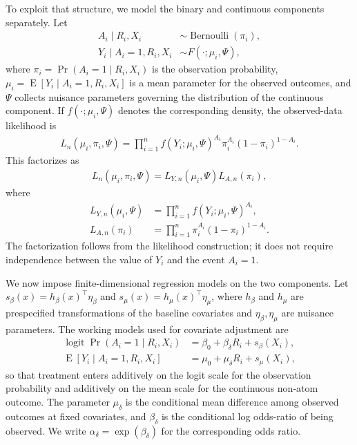 \documentclass[11pt]{article}
\DeclareMathOperator*{\E}{E}
\DeclareMathOperator*{\logit}{logit}
\DeclareMathOperator*{\Bernoulli}{Bernoulli}
\begin{document}
To exploit that structure, we model the binary and continuous components separately. Let
\begin{align*}
  A_i \mid R_i, X_i &\sim \Bernoulli\left(\pi_i\right),\\
  Y_i \mid A_i = 1, R_i, X_i &\sim F\left(\cdot; \mu_i, \Psi\right),
\end{align*}
where $\pi_i = \Pr(A_i = 1 \mid R_i, X_i)$ is the observation probability, $\mu_i = \E[Y_i \mid A_i = 1, R_i, X_i]$ is a mean parameter for the observed outcomes, and $\Psi$ collects nuisance parameters governing the distribution of the continuous component. If $f(\cdot; \mu_i, \Psi)$ denotes the corresponding density, the observed-data likelihood is
\begin{align*}
  L_n(\mu_i, \pi_i, \Psi)
  = \prod_{i = 1}^n
    f\left(Y_i; \mu_i, \Psi\right)^{A_i}
    \pi_i^{A_i}
    \left(1 - \pi_i\right)^{1 - A_i}.
\end{align*}
This factorizes as
\begin{align*}
  L_n(\mu_i, \pi_i, \Psi)
  = L_{Y,n}(\mu_i, \Psi)L_{A,n}(\pi_i),
\end{align*}
where
\begin{align*}
  L_{Y,n}(\mu_i, \Psi)
  &= \prod_{i = 1}^n f\left(Y_i; \mu_i, \Psi\right)^{A_i},\\
  L_{A,n}(\pi_i)
  &= \prod_{i = 1}^n \pi_i^{A_i}\left(1 - \pi_i\right)^{1 - A_i}.
\end{align*}
The factorization follows from the likelihood construction; it does not require independence between the value of $Y_i$ and the event $A_i = 1$.

We now impose finite-dimensional regression models on the two components. Let $s_\beta(x) = h_\beta(x)^\top\eta_\beta$ and $s_\mu(x) = h_\mu(x)^\top\eta_\mu$, where $h_\beta$ and $h_\mu$ are prespecified transformations of the baseline covariates and $\eta_\beta,\eta_\mu$ are nuisance parameters. The working models used for covariate adjustment are
\begin{align}
  \logit \Pr(A_i = 1 \mid R_i, X_i)
  &= \beta_0 + \beta_\delta R_i + s_\beta(X_i),\label{eq:glm1}\\
  \E[Y_i \mid A_i = 1, R_i, X_i]
  &= \mu_0 + \mu_\delta R_i + s_\mu(X_i),\label{eq:glm2}
\end{align}
so that treatment enters additively on the logit scale for the observation probability and additively on the mean scale for the continuous non-atom outcome. The parameter $\mu_\delta$ is the conditional mean difference among observed outcomes at fixed covariates, and $\beta_\delta$ is the conditional log odds-ratio of being observed. We write $\alpha_\delta = \exp(\beta_\delta)$ for the corresponding odds ratio.
\end{document}
